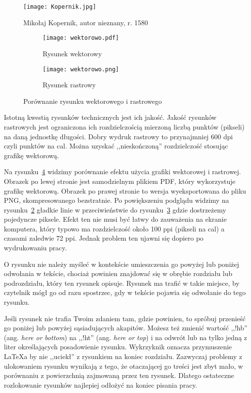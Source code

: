 \begin{figure}[!hb]
	\centering \texttt{[image: Kopernik.jpg]}
	\caption{Mikołaj Kopernik, autor nieznany, r. 1580}
	\label{rys:kopernik}
\end{figure}

\begin{figure}
	\centering
	\begin{subfigure}{.5\textwidth}
		\centering
		\texttt{[image: wektorowo.pdf]}
		\caption{Rysunek wektorowy}
		\label{rys:wektorowopdf}
	\end{subfigure}%
	\begin{subfigure}{.5\textwidth}
		\centering
		\texttt{[image: wektorowo.png]}
		\caption{Rysunek rastrowy}
		\label{rys:wektorowopng}
	\end{subfigure}
	\caption{Porównanie rysunku wektorowego i rastrowego}
	\label{rys:wektorowo}
\end{figure}

Istotną kwestią rysunków technicznych jest ich jakość. Jakość rysunków rastrowych jest ograniczona ich rozdzielczością mierzoną liczbą punktów (pikseli) na daną jednostkę długości. Dobry wydruk rastrowy to przynajmniej 600 dpi czyli punktów na cal. Można uzyskać ,,nieskończoną'' rozdzielczość stosując grafikę wektorową.

Na rysunku~\ref{rys:wektorowo} widzimy porównanie efektu użycia grafiki wektorowej i rastrowej. Obrazek po lewej stronie jest samodzielnym plikiem PDF, który wykorzystuje grafikę wektorową. Obrazek po prawej stronie to wersja wyeksportowana do pliku PNG, skompresowanego bezstratnie. Po powiększeniu podglądu widzimy na rysunku~\ref{rys:wektorowopdf} gładkie linie w przeciwieństwie do rysunku~\ref{rys:wektorowopng} gdzie dostrzeżemy pojedyncze piksele. Efekt ten nie musi być łatwy do zauważenia na ekranie komputera, który typowo ma rozdzielczość około 100 ppi (pikseli na cal) a czasami zaledwie 72 ppi. Jednak problem ten ujawni się dopiero po wydrukowaniu pracy.

O rysunku nie należy myśleć w kontekście umieszczenia go powyżej lub poniżej odwołania w tekście, chociaż powinien znajdować się w obrębie rozdziału lub podrozdziału, który ten rysunek opisuje. Rysunek ma trafić w takie miejsce, by czytelnik mógł go od razu spostrzec, gdy w tekście pojawia się odwołanie do tego rysunku.

Jeśli rysunek nie trafia Twoim zdaniem tam, gdzie powinien, to spróbuj przenieść go poniżej lub powyżej sąsiadujących akapitów. Możesz też zmienić wartość ,,!hb'' (ang. \textit{here or bottom}) na ,,!ht'' (ang. \textit{here or top}) i na odwrót lub na tylko jedną z liter określających posadowienie rysunku. Wykrzyknik oznacza przymuszenie \LaTeX{a} by nie ,,uciekł'' z rysunkiem na koniec rozdziału. Zazwyczaj problemy z ulokowaniem rysunku wynikają z tego, że otaczającej go treści jest zbyt mało, w porównaniu z powierzchnią zajmowaną przez ten rysunek. Dlatego ostateczne rozlokowanie rysunków najlepiej odłożyć na koniec pisania pracy.

